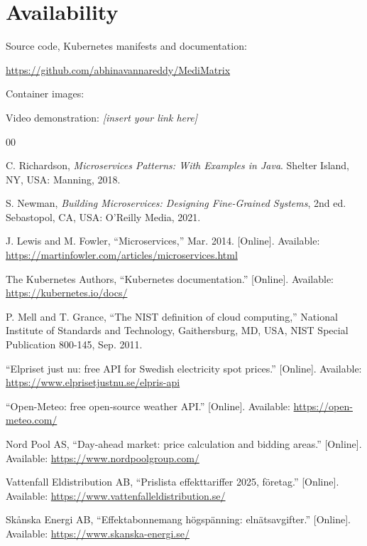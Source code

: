 \documentclass[conference]{IEEEtran}
\begin{document}
\section*{Availability}

Source code, Kubernetes manifests and documentation:

\sloppy
\url{https://github.com/abhinavannareddy/MediMatrix}

Container images:

Video demonstration: \emph{[insert your link here]}

\begin{thebibliography}{00}

 C. Richardson, \emph{Microservices Patterns: With
Examples in Java}. Shelter Island, NY, USA: Manning, 2018.

 S. Newman, \emph{Building Microservices: Designing
Fine-Grained Systems}, 2nd ed. Sebastopol, CA, USA: O'Reilly Media, 2021.

 J. Lewis and M. Fowler, ``Microservices,'' Mar. 2014.
[Online]. Available:
\url{https://martinfowler.com/articles/microservices.html}

 The Kubernetes Authors, ``Kubernetes documentation.''
[Online]. Available: \url{https://kubernetes.io/docs/}

 P. Mell and T. Grance, ``The NIST definition of cloud
computing,'' National Institute of Standards and Technology, Gaithersburg, MD,
USA, NIST Special Publication 800-145, Sep. 2011.

 ``Elpriset just nu: free API for Swedish electricity spot
prices.'' [Online]. Available: \url{https://www.elprisetjustnu.se/elpris-api}

 ``Open-Meteo: free open-source weather API.'' [Online].
Available: \url{https://open-meteo.com/}

 Nord Pool AS, ``Day-ahead market: price calculation and
bidding areas.'' [Online]. Available: \url{https://www.nordpoolgroup.com/}

 Vattenfall Eldistribution AB, ``Prislista
effekttariffer 2025, f\"oretag.'' [Online]. Available:
\url{https://www.vattenfalleldistribution.se/}

 Sk\aa nska Energi AB, ``Effektabonnemang
h\"ogsp\"anning: eln\"atsavgifter.'' [Online]. Available:
\url{https://www.skanska-energi.se/}

\end{thebibliography}
\end{document}
